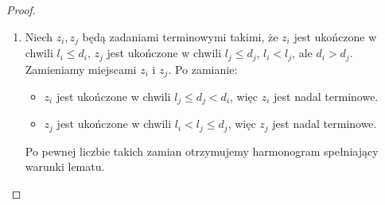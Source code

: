 \begin{proof}
\begin{enumerate}
		      \begin{azfigure}
			      \centering
			      \caption*{Zadanie spóźnione $z_i$ (\textcolor{accentB}{pomarańczowe}) poprzedza zadanie terminowe $z_j$ (\textcolor{accent}{niebieskie}). Po zamianie $z_i$ kończy się jeszcze później (nadal spóźnione), a~$z_j$ wcześniej (nadal terminowe) --- suma kar bez zmian. Krok~2 to ten sam ruch między dwoma zadaniami terminowymi w~złej kolejności deadlinów.}
		      \end{azfigure}

		\item Niech $z_i, z_j$ będą zadaniami terminowymi takimi, że $z_i$ jest ukończone w chwili $l_i \leq d_i$, $z_j$ jest ukończone w chwili $l_j \leq d_j$, $l_i < l_j$, ale $d_i > d_j$.\\
		      Zamieniamy miejscami $z_i$ i $z_j$. Po zamianie:
		      \begin{itemize}[nosep]
			      \item $z_i$ jest ukończone w chwili $l_j \leq d_j < d_i$, więc $z_i$ jest nadal terminowe.
			      \item $z_j$ jest ukończone w chwili $l_i < l_j \leq d_j$, więc $z_j$ jest nadal terminowe.
		      \end{itemize}
		      Po pewnej liczbie takich zamian otrzymujemy harmonogram spełniający warunki lematu.
	\end{enumerate}
\end{proof}
